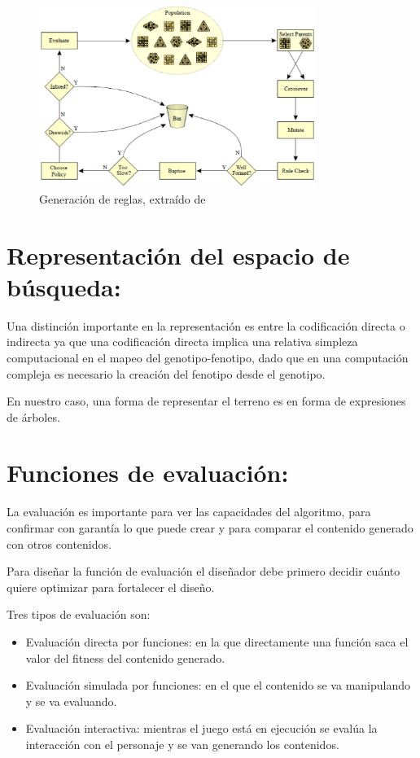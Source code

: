 \begin{figure}[h!]

	\centering
	\includegraphics[width=9cm]{./eps/fig2.eps}
	\caption{Generación de reglas, extraído de \cite{B3}}
	\label{Figura2}

\end{figure}

\section{Representación del espacio de búsqueda:}

Una distinción importante en la representación es entre la codificación directa o indirecta ya que una codificación directa implica una relativa simpleza computacional en el mapeo del genotipo-fenotipo, dado que en una computación compleja es necesario la creación del fenotipo desde el genotipo.\cite{B6}\cite{B7}

En nuestro caso, una forma de representar el terreno es en forma de expresiones de árboles.


\section{Funciones de evaluación:}	

La evaluación es importante para ver las capacidades del algoritmo, para confirmar con garantía lo que puede crear y para comparar el contenido generado con otros contenidos.


Para diseñar la función de evaluación el diseñador debe primero decidir cuánto quiere optimizar para fortalecer el diseño.\cite{B8}


Tres tipos de evaluación son:

\begin{itemize}

\item Evaluación directa por funciones: en la que directamente una función saca el valor del fitness del contenido generado.

\item Evaluación simulada por funciones: en el que el contenido se va manipulando y se va evaluando.


\item Evaluación interactiva: mientras el juego está en ejecución se evalúa la interacción con el personaje y se van generando los contenidos.

\end{itemize}

